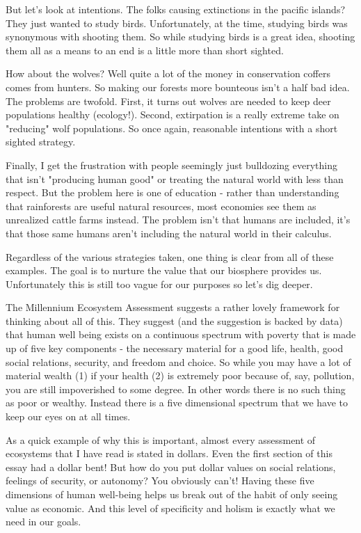 \documentclass[11pt,a5paper]{book}
\begin{document}
But let's look at intentions. The folks causing extinctions in the pacific islands? They just wanted to study birds. Unfortunately, at the time, studying birds was synonymous with shooting them. So while studying birds is a great idea, shooting them all as a means to an end is a little more than short sighted. 

How about the wolves? Well quite a lot of the money in conservation coffers comes from hunters. So making our forests more bounteous isn't a half bad idea. The problems are twofold. First, it turns out wolves are needed to keep deer populations healthy (ecology!). Second, extirpation is a really extreme take on "reducing" wolf populations. So once again, reasonable intentions with a short sighted strategy.

Finally, I get the frustration with people seemingly just bulldozing everything that isn't "producing human good" or treating the natural world with less than respect. But the problem here is one of education - rather than understanding that rainforests are useful natural resources, most economies see them as unrealized cattle farms instead. The problem isn't that humans are included, it's that those same humans aren't including the natural world in their calculus. 

Regardless of the various strategies taken, one thing is clear from all of these examples. The goal is to nurture the value that our biosphere provides us. Unfortunately this is still too vague for our purposes so let's dig deeper.
\newline

The Millennium Ecosystem Assessment \cite{mes} suggests a rather lovely framework for thinking about all of this. They suggest (and the suggestion is backed by data) that human well being exists on a continuous spectrum with poverty that is made up of five key components - the necessary material for a good life, health, good social relations, security, and freedom and choice. So while you may have a lot of material wealth (1) if your health (2) is extremely poor because of, say, pollution, you are still impoverished to some degree. In other words there is no such thing as poor or wealthy. Instead there is a five dimensional spectrum that we have to keep our eyes on at all times. 

As a quick example of why this is important, almost every assessment of ecosystems that I have read is stated in dollars. Even the first section of this essay had a dollar bent! But how do you put dollar values on social relations, feelings of security, or autonomy? You obviously can't! Having these five dimensions of human well-being helps us break out of the habit of only seeing value as economic. And this level of specificity and holism is exactly what we need in our goals.
\newline
\end{document}
